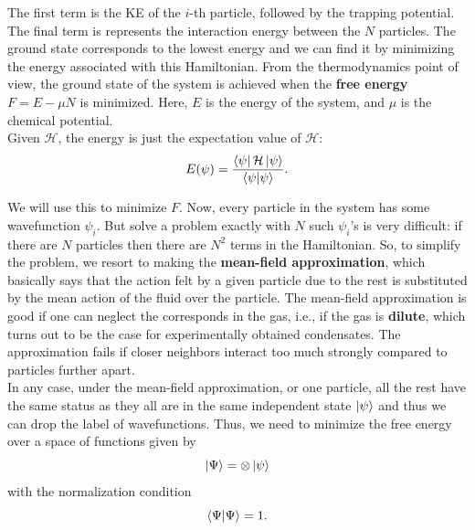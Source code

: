 \documentclass{book}
\theoremstyle{definition}
\newcommand{\ham}{\mathcal{H}}
\newcommand{\f}[2]{\frac{#1}{#2}}
\begin{document}
The first term is the KE of the $i$-th particle, followed by the trapping potential. The final term is represents the interaction energy between the $N$ particles. The ground state corresponds to the lowest energy and we can find it by minimizing the energy associated with this Hamiltonian. From the thermodynamics point of view, the ground state of the system is achieved when the \textbf{free energy} $F = E - \mu N$ is minimized. Here, $E$ is the energy of the system, and $\mu$ is the chemical potential. \\


Given $\ham$, the energy is just the expectation value of $\ham$:
\begin{equation*}
E(\psi) = \f{\bra{\psi} \ham \ket{\psi}}{\braket{\psi}}. 
\end{equation*}

We will use this to minimize $F$. Now, every particle in the system has some wavefunction $\psi_i$. But solve a problem exactly with $N$ such $\psi_i$'s is very difficult: if there are $N$ particles then there are $N^2$ terms in the Hamiltonian. So, to simplify the problem, we resort to making the \textbf{mean-field approximation}, which basically says that the action felt by a given particle due to the rest is substituted by the mean action of the fluid over the particle. The mean-field approximation is good if one can neglect the corresponds in the gas, i.e., if the gas is \textbf{dilute}, which turns out to be the case for experimentally obtained condensates. The approximation fails if closer neighbors interact too much strongly compared to particles further apart. \\


In any case, under the mean-field approximation, or one particle, all the rest have the same status as they all are in the same independent state $\ket{\psi}$ and thus we can drop the label of wavefunctions. Thus, we need to minimize the free energy over a space of functions given by 
\begin{equation*}
\ket{\Psi} = \otimes \ket{\psi}
\end{equation*}
with the normalization condition
\begin{equation*}
\braket{\Psi} = 1.
\end{equation*}
\end{document}
